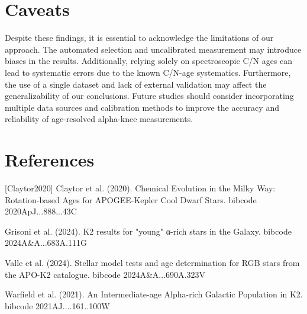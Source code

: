 \documentclass[twocolumn]{aastex631}
\begin{document}
\section{Caveats}
Despite these findings, it is essential to acknowledge the limitations of our approach. The automated selection and uncalibrated measurement may introduce biases in the results. Additionally, relying solely on spectroscopic C/N ages can lead to systematic errors due to the known C/N-age systematics. Furthermore, the use of a single dataset and lack of external validation may affect the generalizability of our conclusions. Future studies should consider incorporating multiple data sources and calibration methods to improve the accuracy and reliability of age-resolved alpha-knee measurements.
\section*{References}
\footnotesize
[Claytor2020] Claytor et al. (2020). Chemical Evolution in the Milky Way: Rotation-based Ages for APOGEE-Kepler Cool Dwarf Stars. bibcode 2020ApJ...888...43C \par [Grisoni2024] Grisoni et al. (2024). K2 results for "young" α-rich stars in the Galaxy. bibcode 2024A\&A...683A.111G \par [Valle2024] Valle et al. (2024). Stellar model tests and age determination for RGB stars from the APO-K2 catalogue. bibcode 2024A\&A...690A.323V \par [Warfield2021] Warfield et al. (2021). An Intermediate-age Alpha-rich Galactic Population in K2. bibcode 2021AJ....161..100W
\end{document}
